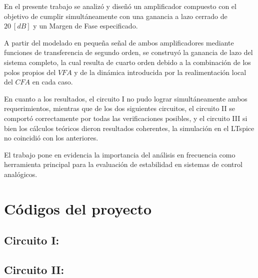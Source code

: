 \documentclass[12pt,a4paper]{article}
\begin{document}
En el presente trabajo se analizó y diseñó un amplificador compuesto con el objetivo de cumplir simultáneamente con una ganancia a lazo cerrado de $20~[dB]$ y un Margen de Fase especificado.

A partir del modelado en pequeña señal de ambos amplificadores mediante funciones de transferencia de segundo orden, se construyó la ganancia de lazo del sistema completo, la cual resulta de cuarto orden debido a la combinación de los polos propios del $VFA$ y de la dinámica introducida por la realimentación local del $CFA$ en cada caso.

En cuanto a los resultados, el circuito I no pudo lograr simultáneamente ambos requerimientos, mientras que de los dos siguientes circuitos, el circuito II se comportó correctamente por todas las verificaciones posibles, y el circuito III si bien los cálculos teóricos dieron resultados coherentes, la simulación en el LTspice no coincidió con los anteriores.

El trabajo pone en evidencia la importancia del análisis en frecuencia como herramienta principal para la evaluación de estabilidad en sistemas de control analógicos.


\newpage
\appendix
\section{Códigos del proyecto}

\subsection{Circuito I:}


\hspace{0.5 cm}


\hspace{0.5 cm}


\hspace{0.5 cm}


\hspace{0.5 cm}

\subsection{Circuito II:}
\end{document}
